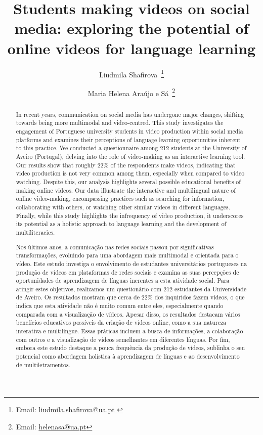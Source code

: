\documentclass[english]{textolivre}
\title{Students making videos on social media: exploring the potential of online videos for language learning}
\author[1]{Liudmila Shafirova~\orcid{0000-0003-3743-2029}\thanks{Email: \href{mailto:liudmila.shafirova@ua.pt }{liudmila.shafirova@ua.pt }}}
\author[1]{Maria Helena Araújo e Sá~\orcid{0000-0002-6623-9642}\thanks{Email: \href{mailto:helenasa@ua.pt}{helenasa@ua.pt}}}
\affil[1]{University of Aveiro, Department of Education and Psychology, Aveiro, Portugal.}
\begin{document}
	
\maketitle
\begin{polyabstract}

\begin{abstract}
In recent years, communication on social media has undergone major changes, shifting towards being more multimodal and video-centred. This study investigates the engagement of Portuguese university students in video production within social media platforms and examines their perceptions of language learning opportunities inherent to this practice. We conducted a questionnaire among 212 students at the University of Aveiro (Portugal), delving into the role of video-making as an interactive learning tool. Our results show that roughly 22\% of the respondents make videos, indicating that video production is not very common among them, especially when compared to video watching. Despite this, our analysis highlights several possible educational benefits of making online videos. Our data illustrate the interactive and multilingual nature of online video-making, encompassing practices such as searching for information, collaborating with others, or watching other similar videos in different languages. Finally, while this study highlights the infrequency of video production, it underscores its potential as a holistic approach to language learning and the development of multiliteracies.


\end{abstract}

\begin{portuguese}
\begin{abstract}
Nos últimos anos, a comunicação nas redes sociais passou por significativas transformações, evoluindo para uma abordagem mais multimodal e orientada para o vídeo. Este estudo investiga o envolvimento de estudantes universitários portugueses na produção de vídeos em plataformas de redes sociais e examina as suas percepções de oportunidades de aprendizagem de línguas inerentes a esta atividade social. Para atingir estes objetivos, realizamos um questionário com 212 estudantes da Universidade de Aveiro. Os resultados mostram que cerca de 22\% dos inquiridos fazem vídeos, o que indica que esta atividade não é muito comum entre eles, especialmente quando comparada com a visualização de vídeos. Apesar disso, os resultados destacam vários benefícios educativos possíveis da criação de vídeos online, como a sua natureza interativa e multilíngue. Essas práticas incluem a busca de informações, a colaboração com outros e a visualização de vídeos semelhantes em diferentes línguas. Por fim, embora este estudo destaque a pouca frequência da produção de vídeos, sublinha o seu potencial como abordagem holística à aprendizagem de línguas e ao desenvolvimento de multiletramentos.


\end{abstract}
\end{portuguese}
\end{polyabstract}
\end{document}
